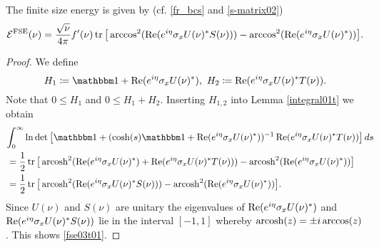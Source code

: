 \begin{proposition}\label{fse03t}
The finite size energy is given by (cf. \eqref{fr_bcs} and \eqref{s-matrix02})
\begin{equation}\label{fse03t01}
   \mathcal{E}^{\text{FSE}}(\nu) = \frac{\sqrt{\nu}}{4\pi}f'(\nu)
     \operatorname{tr}\big[ \arccos^2(\operatorname{Re}(e^{i\eta}\sigma_xU(\nu)^*S(\nu))) - \arccos^2(\operatorname{Re}(e^{i\eta}\sigma_xU(\nu)^*)) \big] .
\end{equation}
\end{proposition}
\begin{proof}
We define
\begin{equation*}
  H_1 \coloneqq \id + \re(e^{i\eta}\sigma_xU(\nu)^*),\ H_2\coloneqq \re(e^{i\eta}\sigma_xU(\nu)^*T(\nu)) .
\end{equation*}
Note that $0\leq H_1$ and $0\leq H_1+H_2$. Inserting $H_{1,2}$ into Lemma \ref{integral01t} we obtain
\begin{equation*}
\begin{split}
  \lefteqn{\int_0^\infty\ln\det\big[ \id + ( \cosh(s)\id + \re(e^{i\eta}\sigma_xU(\nu)^*))^{-1}\re(e^{i\eta}\sigma_xU(\nu)^*T(\nu)) \big]\, ds}\\
    & = \frac{1}{2}\tr\big[ \arcosh^2(\re(e^{i\eta}\sigma_xU(\nu)^*)+\re(e^{i\eta}\sigma_xU(\nu)^*T(\nu)))
                           - \arcosh^2(\re(e^{i\eta}\sigma_xU(\nu)^*)) \big]\\
    & = \frac{1}{2}\tr\big[ \arcosh^2(\re(e^{i\eta}\sigma_xU(\nu)^*S(\nu)))
                           - \arcosh^2(\re(e^{i\eta}\sigma_xU(\nu)^*)) \big] .
\end{split}
\end{equation*}
Since $U(\nu)$ and $S(\nu)$ are unitary the eigenvalues of
$\operatorname{Re}(e^{i\eta}\sigma_xU(\nu)^*)$ and $\operatorname{Re}(e^{i\eta}\sigma_xU(\nu)^*S(\nu))$
lie in the interval $[-1,1]$ whereby $\operatorname{arcosh}(z)=\pm i\arccos(z)$. This shows \eqref{fse03t01}.
\end{proof}
